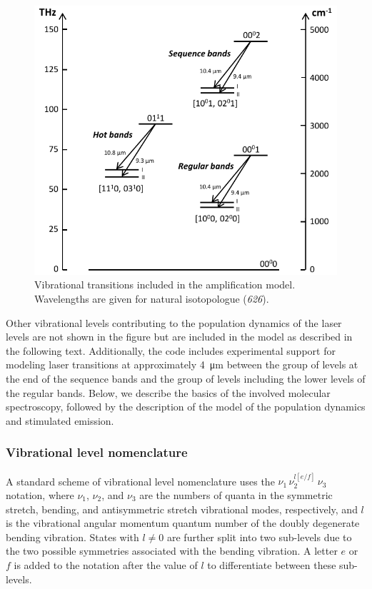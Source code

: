 \begin{figure}[ht]
\centering
\includegraphics[width=120mm]{images/laser-transitions}
\caption{Vibrational transitions included in the amplification model. Wavelengths are given for natural  isotopologue (\textit{626}).}\label{fig:laser-transitions}
\end{figure}

Other vibrational levels contributing to the population dynamics of the laser levels are not shown in the figure but are included in the model as described in the following text. Additionally, the code includes experimental support for modeling laser transitions at approximately \SI{4}{\micro\meter} between the group of levels at the end of the sequence bands and the group of levels including the lower levels of the regular bands. Below, we describe the basics of the involved molecular spectroscopy, followed by the description of the model of the population dynamics and stimulated emission.



\subsubsection{Vibrational level nomenclature}

A standard scheme of vibrational level nomenclature uses the $\nu_1\,\nu_2^{l[e/f]}\,\nu_3$ notation, where $\nu_1$, $\nu_2$, and $\nu_3$ are the numbers of quanta in the symmetric stretch, bending, and antisymmetric stretch vibrational modes, respectively, and $l$ is the vibrational angular momentum quantum number of the doubly degenerate bending vibration. States with $l \neq 0$ are further split into two sub-levels due to the two possible symmetries associated with the bending vibration. A letter $e$ or $f$ is added to the notation after the value of $l$ to differentiate between these sub-levels.

